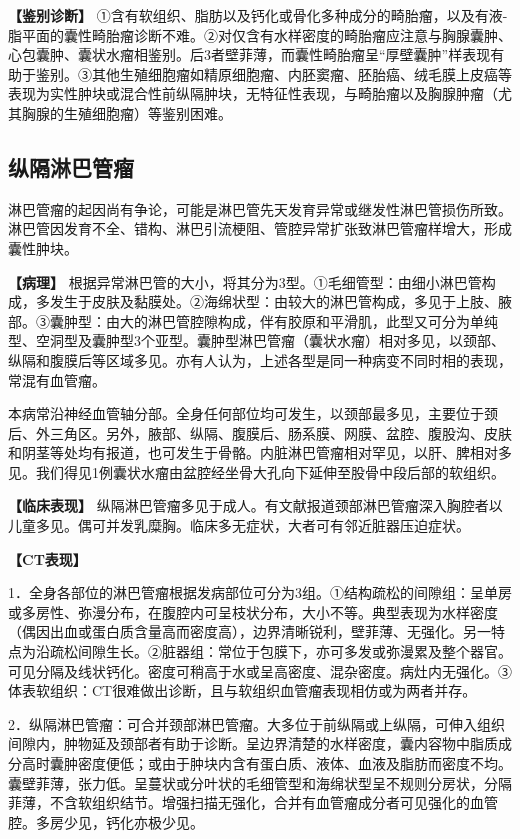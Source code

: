 \textbf{【鉴别诊断】}
①含有软组织、脂肪以及钙化或骨化多种成分的畸胎瘤，以及有液-脂平面的囊性畸胎瘤诊断不难。②对仅含有水样密度的畸胎瘤应注意与胸腺囊肿、心包囊肿、囊状水瘤相鉴别。后3者壁菲薄，而囊性畸胎瘤呈“厚壁囊肿”样表现有助于鉴别。③其他生殖细胞瘤如精原细胞瘤、内胚窦瘤、胚胎癌、绒毛膜上皮癌等表现为实性肿块或混合性前纵隔肿块，无特征性表现，与畸胎瘤以及胸腺肿瘤（尤其胸腺的生殖细胞瘤）等鉴别困难。

\subsection{纵隔淋巴管瘤}

淋巴管瘤的起因尚有争论，可能是淋巴管先天发育异常或继发性淋巴管损伤所致。淋巴管因发育不全、错构、淋巴引流梗阻、管腔异常扩张致淋巴管瘤样增大，形成囊性肿块。

\textbf{【病理】}
根据异常淋巴管的大小，将其分为3型。①毛细管型：由细小淋巴管构成，多发生于皮肤及黏膜处。②海绵状型：由较大的淋巴管构成，多见于上肢、腋部。③囊肿型：由大的淋巴管腔隙构成，伴有胶原和平滑肌，此型又可分为单纯型、空洞型及囊肿型3个亚型。囊肿型淋巴管瘤（囊状水瘤）相对多见，以颈部、纵隔和腹膜后等区域多见。亦有人认为，上述各型是同一种病变不同时相的表现，常混有血管瘤。

本病常沿神经血管轴分部。全身任何部位均可发生，以颈部最多见，主要位于颈后、外三角区。另外，腋部、纵隔、腹膜后、肠系膜、网膜、盆腔、腹股沟、皮肤和阴茎等处均有报道，也可发生于骨骼。内脏淋巴管瘤相对罕见，以肝、脾相对多见。我们得见1例囊状水瘤由盆腔经坐骨大孔向下延伸至股骨中段后部的软组织。

\textbf{【临床表现】}
纵隔淋巴管瘤多见于成人。有文献报道颈部淋巴管瘤深入胸腔者以儿童多见。偶可并发乳糜胸。临床多无症状，大者可有邻近脏器压迫症状。

\textbf{【CT表现】}

1．全身各部位的淋巴管瘤根据发病部位可分为3组。①结构疏松的间隙组：呈单房或多房性、弥漫分布，在腹腔内可呈枝状分布，大小不等。典型表现为水样密度（偶因出血或蛋白质含量高而密度高），边界清晰锐利，壁菲薄、无强化。另一特点为沿疏松间隙生长。②脏器组：常位于包膜下，亦可多发或弥漫累及整个器官。可见分隔及线状钙化。密度可稍高于水或呈高密度、混杂密度。病灶内无强化。③体表软组织：CT很难做出诊断，且与软组织血管瘤表现相仿或为两者并存。

2．纵隔淋巴管瘤：可合并颈部淋巴管瘤。大多位于前纵隔或上纵隔，可伸入组织间隙内，肿物延及颈部者有助于诊断。呈边界清楚的水样密度，囊内容物中脂质成分高时囊肿密度便低；或由于肿块内含有蛋白质、液体、血液及脂肪而密度不均。囊壁菲薄，张力低。呈蔓状或分叶状的毛细管型和海绵状型呈不规则分房状，分隔菲薄，不含软组织结节。增强扫描无强化，合并有血管瘤成分者可见强化的血管腔。多房少见，钙化亦极少见。

